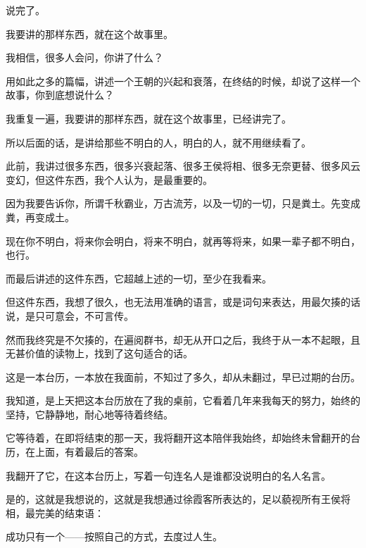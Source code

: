 \begin{multicols}{\theparacolNo}
		说完了。

		我要讲的那样东西，就在这个故事里。

		我相信，很多人会问，你讲了什么？

		用如此之多的篇幅，讲述一个王朝的兴起和衰落，在终结的时候，却说了这样一个故事，你到底想说什么？

		我重复一遍，我要讲的那样东西，就在这个故事里，已经讲完了。

		所以后面的话，是讲给那些不明白的人，明白的人，就不用继续看了。

		此前，我讲过很多东西，很多兴衰起落、很多王侯将相、很多无奈更替、很多风云变幻，但这件东西，我个人认为，是最重要的。

		因为我要告诉你，所谓千秋霸业，万古流芳，以及一切的一切，只是粪土。先变成粪，再变成土。

		现在你不明白，将来你会明白，将来不明白，就再等将来，如果一辈子都不明白，也行。

		而最后讲述的这件东西，它超越上述的一切，至少在我看来。

		但这件东西，我想了很久，也无法用准确的语言，或是词句来表达，用最欠揍的话说，是只可意会，不可言传。

		然而我终究是不欠揍的，在遍阅群书，却无从开口之后，我终于从一本不起眼，且无甚价值的读物上，找到了这句适合的话。

		这是一本台历，一本放在我面前，不知过了多久，却从未翻过，早已过期的台历。

		我知道，是上天把这本台历放在了我的桌前，它看着几年来我每天的努力，始终的坚持，它静静地，耐心地等待着终结。

		它等待着，在即将结束的那一天，我将翻开这本陪伴我始终，却始终未曾翻开的台历，在上面，有着最后的答案。

		我翻开了它，在这本台历上，写着一句连名人是谁都没说明白的名人名言。

		是的，这就是我想说的，这就是我想通过徐霞客所表达的，足以藐视所有王侯将相，最完美的结束语：

		成功只有一个——按照自己的方式，去度过人生。
		\ifnum{}
	\end{multicols}
\fi
